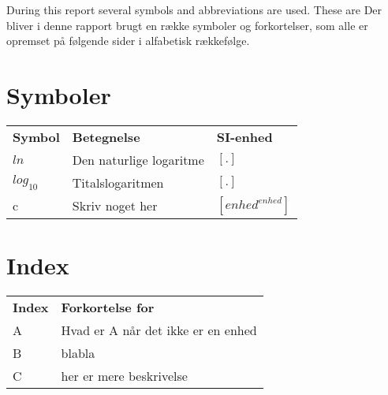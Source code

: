 
During this report several symbols and abbreviations are used. These are 
Der bliver i denne rapport brugt en række symboler og forkortelser, som alle er opremset på følgende sider i alfabetisk rækkefølge.
 
\section*{Symboler}
\begin{table}[h!]
    	\begin{tabular}{p{}|p{}|p{}}
           	\textbf{Symbol}&\textbf{Betegnelse}&\textbf{SI-enhed}
           	\\         	
           	$ln$& Den naturlige logaritme &$[.]$
           	\\
           	$log_{10}$& Titalslogaritmen&$[.]$
           	\\
           	c&Skriv noget her &$[enhed^{enhed}]$
           	\\         	
    	\end{tabular}
\end{table}
\newpage
 
\section*{Index}
\begin{table}[h!]
    	\begin{tabular}{p{}|p{}}
           	\textbf{Index}&\textbf{Forkortelse for}           	
           	\\
           	A&Hvad er A når det ikke er en enhed
           	\\
           	B& blabla
           	\\
           	C& her er mere beskrivelse        	
    	\end{tabular}
\end{table}
\newpage
 
